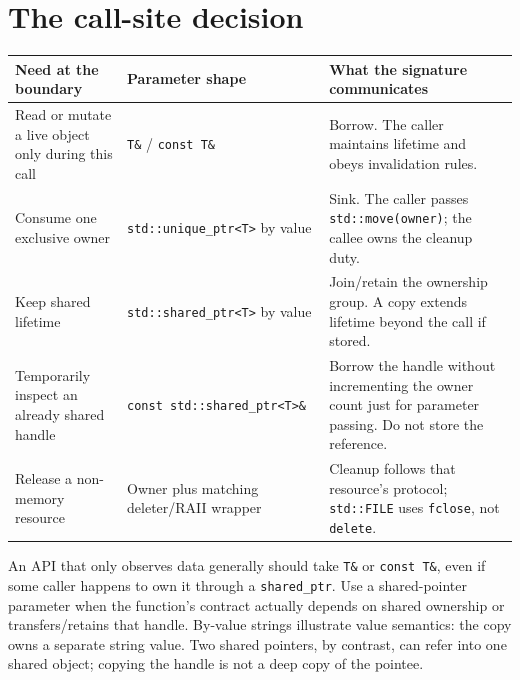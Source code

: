\section{The call-site decision}\label{05-engine-i-ch003-the-call-site-decision}

{\def\LTcaptype{none} %
\begin{longtable}[]{@{}
  >{\raggedright\arraybackslash}p{}
  >{\raggedright\arraybackslash}p{}
  >{\raggedright\arraybackslash}p{}@{}}
\toprule\noalign{}
\begin{minipage}[b]{\linewidth}\raggedright
Need at the boundary
\end{minipage} & \begin{minipage}[b]{\linewidth}\raggedright
Parameter shape
\end{minipage} & \begin{minipage}[b]{\linewidth}\raggedright
What the signature communicates
\end{minipage} \\
\midrule\noalign{}
\endhead
\bottomrule\noalign{}
\endlastfoot
Read or mutate a live object only during this call & \texttt{T\&} / \texttt{const\ T\&} & Borrow. The caller maintains lifetime and obeys invalidation rules. \\
Consume one exclusive owner & \texttt{std::unique\_ptr\textless{}T\textgreater{}} by value & Sink. The caller passes \texttt{std::move(owner)}; the callee owns the cleanup duty. \\
Keep shared lifetime & \texttt{std::shared\_ptr\textless{}T\textgreater{}} by value & Join/retain the ownership group. A copy extends lifetime beyond the call if stored. \\
Temporarily inspect an already shared handle & \texttt{const\ std::shared\_ptr\textless{}T\textgreater{}\&} & Borrow the handle without incrementing the owner count just for parameter passing. Do not store the reference. \\
Release a non-memory resource & Owner plus matching deleter/RAII wrapper & Cleanup follows that resource's protocol; \texttt{std::FILE} uses \texttt{fclose}, not \texttt{delete}. \\
\end{longtable}
}

An API that only observes data generally should take \texttt{T\&} or \texttt{const\ T\&}, even if some caller happens to own it through a \texttt{shared\_ptr}. Use a shared-pointer parameter when the function's contract actually depends on shared ownership or transfers/retains that handle. By-value strings illustrate value semantics: the copy owns a separate string value. Two shared pointers, by contrast, can refer into one shared object; copying the handle is not a deep copy of the pointee.

